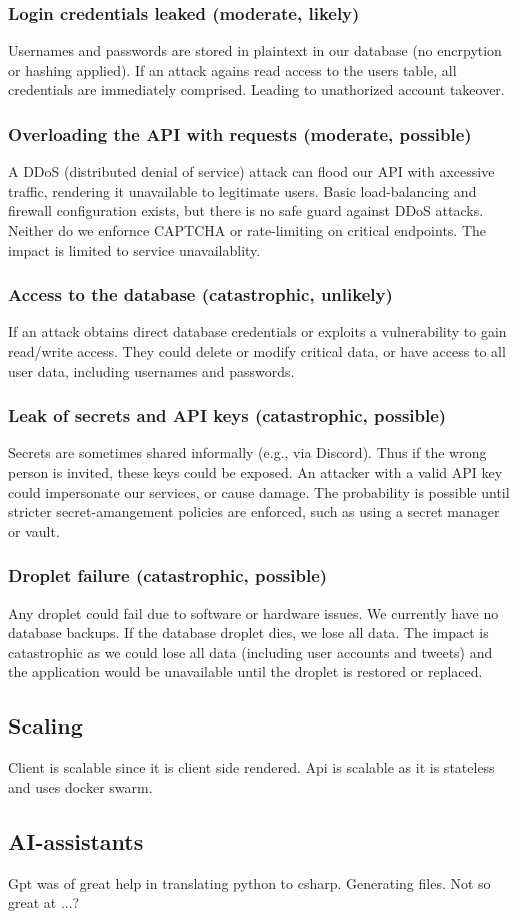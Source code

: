 \subsubsection{Login credentials leaked (moderate, likely)}
Usernames and passwords are stored in plaintext in our 
database (no encrpytion or hashing applied). If an attack 
agains read access to the users table, all credentials are 
immediately comprised. Leading to unathorized account takeover. 

\subsubsection{Overloading the API with requests (moderate, possible)} 
A DDoS (distributed denial of service) attack can flood our API with 
axcessive traffic, rendering it unavailable to legitimate users. 
Basic load-balancing and firewall configuration exists, but there is no 
safe guard against DDoS attacks. Neither do we enfornce CAPTCHA or 
rate-limiting on critical endpoints. The impact is limited to service unavailablity. 
      
\subsubsection{Access to the database (catastrophic, unlikely)} 
If an attack obtains direct database credentials or exploits a 
vulnerability to gain read/write access. They could delete or modify 
critical data, or have access to all user data, including usernames 
and passwords.

\subsubsection{Leak of secrets and API keys (catastrophic, possible)}
Secrets are sometimes shared informally (e.g., via Discord). 
Thus if the wrong person is invited, these keys could be exposed. 
An attacker with a valid API key could impersonate our services, 
or cause damage. The probability is possible until stricter 
secret-amangement policies are enforced, such as using a secret manager or vault.

\subsubsection{Droplet failure (catastrophic, possible)}
Any droplet could fail due to software or hardware issues. We currently have 
no database backups. If the database droplet dies, we lose all data. 
The impact is catastrophic as we could lose all data (including user accounts 
and tweets) and the application would be unavailable until the droplet is 
restored or replaced.


\subsection{Scaling}

Client is scalable since it is client side rendered.
Api is scalable as it is stateless and uses docker swarm.

\subsection{AI-assistants}

Gpt was of great help in translating python to csharp.
Generating files.
Not so great at ...?